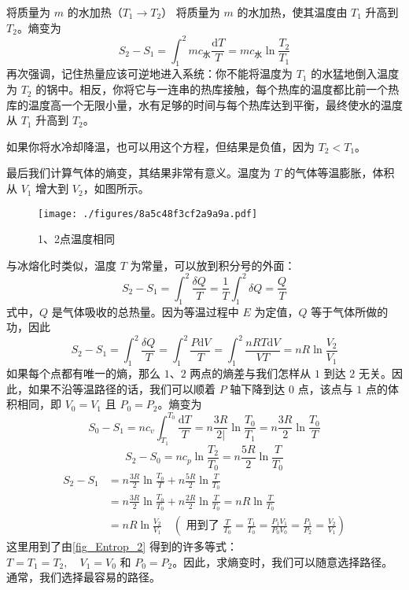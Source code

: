 \begin{example}{将质量为 $m $ 的水加热（$T_1\to T_2$）}
将质量为 $m$ 的水加热，使其温度由 $T_1$ 升高到 $T_2$。熵变为
\begin{equation}
S_2-S_1=\int_1^2{mc_{\text{水}}\frac{\text{d}T}{T}}=mc_{\text{水}}\ln \frac{T_2}{T_1}
\end{equation}
再次强调，记住热量应该可逆地进入系统：你不能将温度为 $T_1$ 的水猛地倒入温度为 $T_2$ 的锅中。相反，你将它与一连串的热库接触，每个热库的温度都比前一个热库的温度高一个无限小量，水有足够的时间与每个热库达到平衡，最终使水的温度从 $T_1$ 升高到 $T_2$。

如果你将水冷却降温，也可以用这个方程，但结果是负值，因为 $T_2<T_1$。

最后我们计算气体的熵变，其结果非常有意义。温度为 $T $ 的气体等温膨胀，体积从 $V_1$ 增大到 $V_2$，如图所示。
\begin{figure}[ht]
\centering
\texttt{[image: ./figures/8a5c48f3cf2a9a9a.pdf]}
\caption{1、2点温度相同} \label{fig_Entrop_2}
\end{figure}
\end{example}
与冰熔化时类似，温度 $T $ 为常量，可以放到积分号的外面：
\begin{equation}
S_2-S_1=\int_1^2{\frac{\delta Q}{T}}=\frac{1}{T}\int_1^2{\delta Q=\frac{Q}{T}}
\end{equation}
式中，$ Q $ 是气体吸收的总热量。因为等温过程中 $E$ 为定值，$Q$ 等于气体所做的功，因此
\begin{equation}
S_2-S_1=\int_1^2{\frac{\delta Q}{T}}=\int_1^2{\frac{P\text{d}V}{T}}=\int_1^2{\frac{nRT\text{d}V}{VT}=nR\ln \frac{V_2}{V_1}}
\end{equation}
如果每个点都有唯一的熵，那么 $1$、$2$ 两点的熵差与我们怎样从 $1$ 到达 $2 $ 无关。因此，如果不沿等温路径的话，我们可以顺着 $P $ 轴下降到达 $0 $ 点，该点与 $1 $ 点的体积相同，即 $V_0=V_1$ 且 $P_0=P_2$。熵变为
\begin{equation}
S_{0}-S_{1}=n c_{v} \int_{T_{1}}^{T_{0}} \frac{\mathrm{d} T}{T}=n \frac{3 R}{2 |} \ln \frac{T_{0}}{T_{1}}=n \frac{3 R}{2} \ln \frac{T_{0}}{T}
\end{equation}
\begin{equation}
S_{2}-S_{0}=n c_{p} \ln \frac{T_{2}}{T_{0}}=n \frac{5 R}{2} \ln \frac{T}{T_{0}}
\end{equation}
\begin{equation}
\begin{aligned} S_{2}-S_{1} &=n \frac{3 R}{2} \ln \frac{T_{0}}{T}+n \frac{5 R}{2} \ln \frac{T}{T_{0}} \\ &=n \frac{3 R}{2} \ln \frac{T_{0}}{T_{0}}+n \frac{2 R}{2} \ln \frac{T}{T_{0}}=n R \ln \frac{T}{T_{0}} \\ &=n R \ln \frac{V_{2}}{V_{1}} \quad\left(\text { 用到了 } \frac{T}{T_{0}}=\frac{T_{1}}{T_{0}}=\frac{P_{1} V_{1}}{P_{0} V_{0}}=\frac{P_{1}}{P_{2}}=\frac{V_{2}}{V_{1}}\right) \end{aligned}
\end{equation}
这里用到了由\autoref{fig_Entrop_2} 得到的许多等式：$T=T_{1}=T_{2}, \quad V_{1}=V_{0} \text { 和 } P_{0}=P_{2}$。因此，求熵变时，我们可以随意选择路径。通常，我们选择最容易的路径。

